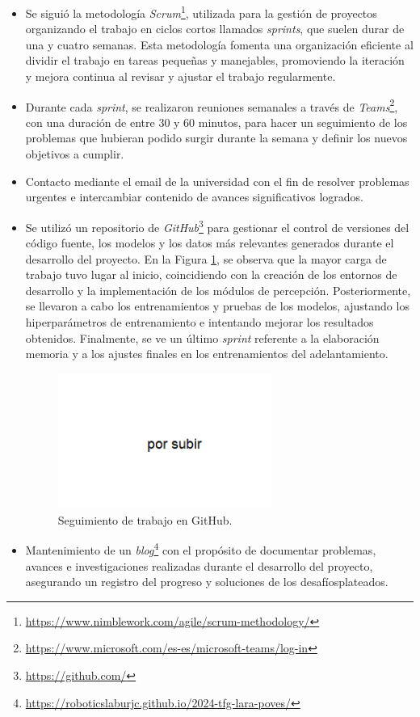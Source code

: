 \begin{itemize}
\item Se siguió la metodología \textit{Scrum}\footnote{\url{https://www.nimblework.com/agile/scrum-methodology/}}, utilizada para la gestión de proyectos organizando el trabajo en ciclos cortos llamados \textit{sprints}, que suelen durar de una y cuatro semanas. Esta metodología fomenta una organización eficiente al dividir el trabajo en tareas pequeñas y manejables, promoviendo la iteración y mejora continua al revisar y ajustar el trabajo regularmente.
\item Durante cada \textit{sprint}, se realizaron reuniones semanales a través de \textit{Teams}\footnote{\url{https://www.microsoft.com/es-es/microsoft-teams/log-in}}, con una duración de entre 30 y 60 minutos, para hacer un seguimiento de los problemas que hubieran podido surgir durante la semana y definir los nuevos objetivos a cumplir.
\item Contacto mediante el email de la universidad con el fin de resolver problemas urgentes e intercambiar contenido de avances significativos logrados.
\item Se utilizó un repositorio de \textit{GitHub}\footnote{\url{https://github.com/}} para gestionar el control de versiones del código fuente, los modelos y los datos más relevantes generados durante el desarrollo del proyecto. En la Figura \ref{fig:github}, se observa que la mayor carga de trabajo tuvo lugar al inicio, coincidiendo con la creación de los entornos de desarrollo y la implementación de los módulos de percepción. Posteriormente, se llevaron a cabo los entrenamientos y pruebas de los modelos, ajustando los hiperparámetros de entrenamiento e intentando mejorar los resultados obtenidos. Finalmente, se ve un último \textit{sprint} referente a la elaboración memoria y a los ajustes finales en los entrenamientos del adelantamiento.

\begin{figure}[ht]
\centering
\includegraphics[width=7cm]{figs/objetivos/github.png}
\caption{Seguimiento de trabajo en GitHub.}
\label{fig:github}
\end{figure}

\item Mantenimiento de un \textit{blog}\footnote{\url{https://roboticslaburjc.github.io/2024-tfg-lara-poves/}} con el propósito de documentar problemas, avances e investigaciones realizadas durante el desarrollo del proyecto, asegurando un registro del progreso y soluciones de los desafíosplateados.

\end{itemize}

